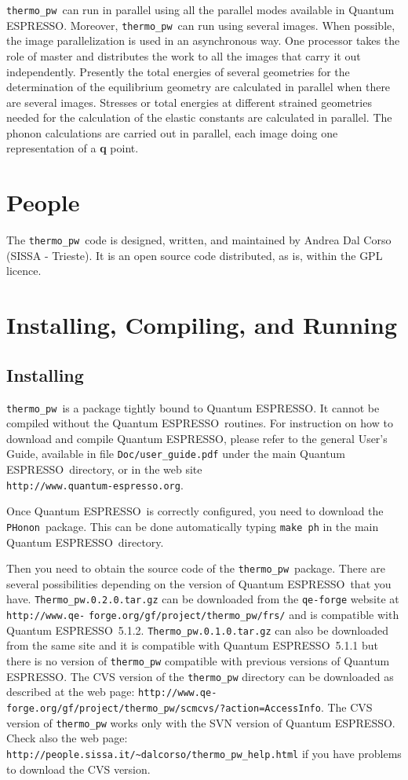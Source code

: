 \documentclass[12pt,a4paper]{article}
\def\qe{{\sc Quantum ESPRESSO}}
\def\PHonon{\texttt{PHonon}}
\def\thermo{\texttt{thermo\_pw}}
\begin{document}
\thermo\ can run in parallel using all the parallel modes available in
\qe. Moreover, \thermo\ can run using several images.
When possible, the image parallelization is used in an asynchronous way.
One processor takes the role of master and distributes the work 
to all the images that carry it out independently. Presently 
the total energies of several geometries for the determination of the 
equilibrium geometry are calculated in parallel when
there are several images. Stresses or total energies at different strained 
geometries needed for the calculation of the elastic constants are 
calculated in parallel. 
The phonon calculations are carried out in parallel, each image doing one 
representation of a {\bf q} point.

\section{People}
The \thermo\ code is designed, written, and maintained by Andrea Dal Corso 
(SISSA - Trieste). It is an open source code distributed, as is, within the GPL
licence.  

\section{Installing, Compiling, and Running}

\subsection{Installing}

\thermo\ is a package tightly bound to \qe. It cannot be compiled without
the \qe\ routines. For instruction on how to download and compile \qe, please 
refer to the general User's Guide, available in file \texttt{Doc/user\_guide.pdf}
under the main \qe\ directory, or in the web site \\
\texttt{http://www.quantum-espresso.org}.

Once \qe\ is correctly configured, you need to download the \PHonon\ 
package. This can be done automatically typing \texttt{make ph} in
the main \qe\ directory.

Then you need to obtain the source code of the \thermo\ package. There
are several possibilities depending on the version of \qe\ that you have.
\texttt{Thermo\_pw.0.2.0.tar.gz} can be downloaded from the 
\texttt{qe-forge} website at \texttt{http://www.qe-} 
\texttt{forge.org/gf/project/thermo\_pw/frs/} and is 
compatible with \qe\ 5.1.2. \texttt{Thermo\_pw.0.1.0.tar.gz} can also 
be downloaded from the same site and it is
compatible with \qe\ 5.1.1 but there is no version of \texttt{thermo\_pw} 
compatible with previous versions of \qe.
The CVS version of the \texttt{thermo\_pw} directory can be downloaded as 
described at
the web page: \texttt{http://www.qe-} \texttt{forge.org/gf/project/thermo\_pw/scmcvs/?action=AccessInfo}.
The CVS version of \texttt{thermo\_pw} works only with the SVN version of \qe. 
Check also the web page:
\texttt{http://people.sissa.it/\textasciitilde dalcorso/thermo\_pw\_help.html} if you
have problems to download the CVS version.
\end{document}
